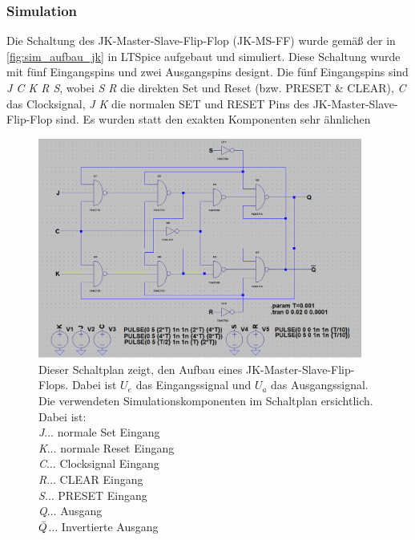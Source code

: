 \documentclass[12pt,english,ngerman]{scrartcl}
\begin{document}
\subsubsection{Simulation}

Die Schaltung des JK-Master-Slave-Flip-Flop (JK-MS-FF) wurde gemäß der
 in \autoref{fig:sim_aufbau_jk} in
LTSpice aufgebaut und simuliert. Diese Schaltung wurde mit fünf Eingangspins
und zwei Ausgangspins designt. Die fünf Eingangspins sind \textit{J C K R S},
wobei \textit{S R} die direkten Set und Reset (bzw. PRESET \& CLEAR), \textit{C} das
Clocksignal, \textit{J K} die normalen SET und RESET Pins des
JK-Master-Slave-Flip-Flop sind. Es wurden statt den exakten Komponenten sehr
ähnlichen 

\begin{figure}[H]
  \centering
  \includegraphics[width=0.95\textwidth]{./figures/sim/jk/aufbaujk.png}
    \caption{Dieser Schaltplan zeigt, den Aufbau eines
      JK-Master-Slave-Flip-Flops. Dabei ist $U_e$ das Eingangssignal und $U_a$
      das Ausgangssignal. Die verwendeten Simulationskomponenten im Schaltplan
      ersichtlich.
    Dabei ist:\\
    \textit{J}$\dots$ normale Set Eingang\\
    \textit{K}$\dots$ normale Reset Eingang\\
    \textit{C}$\dots$ Clocksignal Eingang\\
    \textit{R}$\dots$ CLEAR Eingang\\
    \textit{S}$\dots$ PRESET Eingang\\
    \textit{Q}$\dots$ Ausgang\\
    \textit{$\Bar{Q}$}$\dots$ Invertierte Ausgang\\
  }
  \label{fig:sim_aufbau_jk}
\end{figure}
\end{document}
